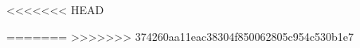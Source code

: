 <<<<<<< HEAD


\newenvironment{reflist} {\color{red}\begin{list} {} {\listparindent -.25in
\leftmargin .3in} \item \vspace{-.3in} } {\end{list} }

\newcommand\superscript\textsuperscript
=======
>>>>>>> 374260aa11eac38304f850062805c954c530b1e7
